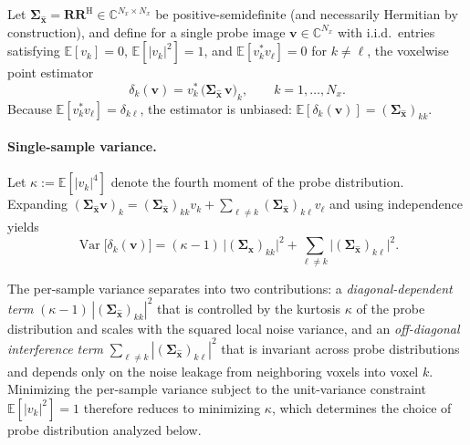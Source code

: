 \documentclass[AMA,STIX2COL,Linenumberson]{MRM}
\begin{document}
Let 
$\boldsymbol{\Sigma}_{\hat{\mathbf{x}}} 
= \mathbf{R}\mathbf{R}^{\mathrm{H}} \in \mathbb{C}^{N_x \times N_x}$
be positive-semidefinite (and necessarily Hermitian by construction), and define for a single probe image
$\mathbf{v} \in \mathbb{C}^{N_x}$ with i.i.d.\ entries satisfying
$\mathbb{E}[v_k] = 0$,
$\mathbb{E}[|v_k|^2] = 1$, and
$\mathbb{E}[v_k^{*}v_\ell] = 0$ for $k \neq \ell$,
the voxelwise point estimator
\[
  \delta_k(\mathbf{v})
  = v_k^{*}\,
  \bigl(\boldsymbol{\Sigma}_{\hat{\mathbf{x}}}\,\mathbf{v}\bigr)_k,
  \qquad k = 1,\dots,N_x.
\]
Because $\mathbb{E}[v_k^{*}v_\ell] = \delta_{k\ell}$,
the estimator is unbiased:
$\mathbb{E}[\delta_k(\mathbf{v})]
= (\boldsymbol{\Sigma}_{\hat{\mathbf{x}}})_{kk}$.
 
\paragraph{Single-sample variance.}
Let $\kappa := \mathbb{E}[|v_k|^{4}]$ denote the fourth moment of
the probe distribution. Expanding
$(\boldsymbol{\Sigma}_{\hat{\mathbf{x}}}\mathbf{v})_k
= (\boldsymbol{\Sigma}_{\hat{\mathbf{x}}})_{kk}v_k
+ \sum_{\ell \neq k} (\boldsymbol{\Sigma}_{\hat{\mathbf{x}}})_{k\ell} v_\ell$
and using independence yields
\begin{equation}
\operatorname{Var}\!\bigl[\delta_k(\mathbf{v})\bigr]
  = (\kappa - 1)\,
    \bigl|(\boldsymbol{\Sigma}_{\hat{\mathbf{x}}})_{kk}\bigr|^{2}
   + \sum_{\ell \neq k}
    \bigl|(\boldsymbol{\Sigma}_{\hat{\mathbf{x}}})_{k\ell}\bigr|^{2}.
\tag{A1}\label{eq:var_single_sample}
\end{equation}

The per-sample variance separates into two contributions: a \emph{diagonal-dependent term} $(\kappa - 1)\,|(\boldsymbol{\Sigma}_{\hat{\mathbf{x}}})_{kk}|^2$ that is controlled by the kurtosis $\kappa$ of the probe distribution and scales with the squared local noise variance, and an \emph{off-diagonal interference term} $\sum_{\ell \neq k}|(\boldsymbol{\Sigma}_{\hat{\mathbf{x}}})_{k\ell}|^2$ that is invariant across probe distributions and depends only on the noise leakage from neighboring voxels into voxel $k$. Minimizing the per-sample variance subject to the unit-variance constraint $\mathbb{E}[|v_k|^2] = 1$ therefore reduces to minimizing $\kappa$, which determines the choice of probe distribution analyzed below.
\end{document}
